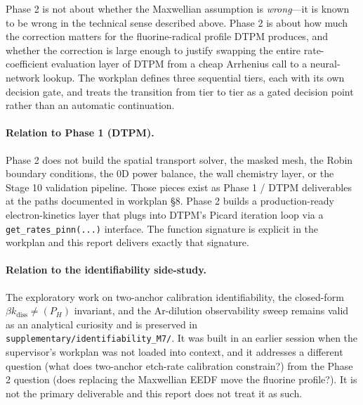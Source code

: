 \documentclass[11pt,a4paper]{article}
\newcommand{\kdiss}{k_{\mathrm{diss}}}
\begin{document}
Phase 2 is not about whether the Maxwellian assumption is
\emph{wrong}---it is known to be wrong in the technical sense
described above. Phase 2 is about how much the correction matters
for the fluorine-radical profile DTPM produces, and whether the
correction is large enough to justify swapping the entire
rate-coefficient evaluation layer of DTPM from a cheap Arrhenius
call to a neural-network lookup. The workplan defines three
sequential tiers, each with its own decision gate, and treats the
transition from tier to tier as a gated decision point rather
than an automatic continuation.

\paragraph{Relation to Phase 1 (DTPM).} Phase 2 does not build the
spatial transport solver, the masked mesh, the Robin boundary
conditions, the 0D power balance, the wall chemistry layer, or
the Stage 10 validation pipeline. Those pieces exist as
Phase 1 / DTPM deliverables at the paths documented in workplan
§8. Phase 2 builds a production-ready electron-kinetics layer
that plugs into DTPM's Picard iteration loop via a
\texttt{get\_rates\_pinn(...)} interface. The function signature
is explicit in the workplan and this report delivers exactly that
signature.

\paragraph{Relation to the identifiability side-study.} The
exploratory work on two-anchor calibration identifiability, the
closed-form $\beta \kdiss \ne(P_H)$ invariant, and the Ar-dilution
observability sweep remains valid as an analytical curiosity and
is preserved in \texttt{supplementary/identifiability\_M7/}. It
was built in an earlier session when the supervisor's workplan
was not loaded into context, and it addresses a different
question (what does two-anchor etch-rate calibration constrain?)
from the Phase 2 question (does replacing the Maxwellian EEDF
move the fluorine profile?). It is not the primary deliverable
and this report does not treat it as such.
\end{document}
